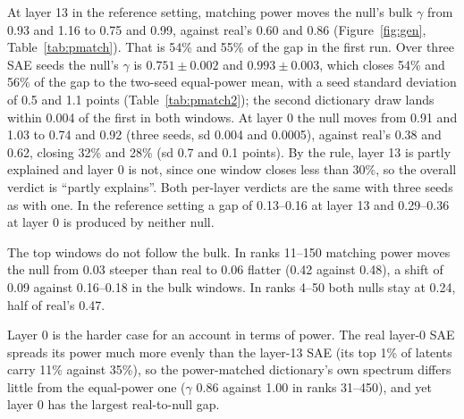\documentclass[10pt,twocolumn]{article}
\begin{document}
At layer 13 in the reference setting, matching power moves the null's bulk $\gamma$ from 0.93 and 1.16 to 0.75 and 0.99, against real's 0.60 and 0.86 (Figure~\ref{fig:gen}, Table~\ref{tab:pmatch}). That is 54\% and 55\% of the gap in the first run. Over three SAE seeds the null's $\gamma$ is $0.751\pm0.002$ and $0.993\pm0.003$, which closes 54\% and 56\% of the gap to the two-seed equal-power mean, with a seed standard deviation of 0.5 and 1.1 points (Table~\ref{tab:pmatch2}); the second dictionary draw lands within 0.004 of the first in both windows. At layer 0 the null moves from 0.91 and 1.03 to 0.74 and 0.92 (three seeds, sd 0.004 and 0.0005), against real's 0.38 and 0.62, closing 32\% and 28\% (sd 0.7 and 0.1 points). By the rule, layer 13 is partly explained and layer 0 is not, since one window closes less than 30\%, so the overall verdict is ``partly explains''. Both per-layer verdicts are the same with three seeds as with one. In the reference setting a gap of 0.13--0.16 at layer 13 and 0.29--0.36 at layer 0 is produced by neither null.

The top windows do not follow the bulk. In ranks 11--150 matching power moves the null from 0.03 steeper than real to 0.06 flatter (0.42 against 0.48), a shift of 0.09 against 0.16--0.18 in the bulk windows. In ranks 4--50 both nulls stay at 0.24, half of real's 0.47.

Layer 0 is the harder case for an account in terms of power. The real layer-0 SAE spreads its power much more evenly than the layer-13 SAE (its top 1\% of latents carry 11\% against 35\%), so the power-matched dictionary's own spectrum differs little from the equal-power one ($\gamma$ 0.86 against 1.00 in ranks 31--450), and yet layer 0 has the largest real-to-null gap.
\end{document}
